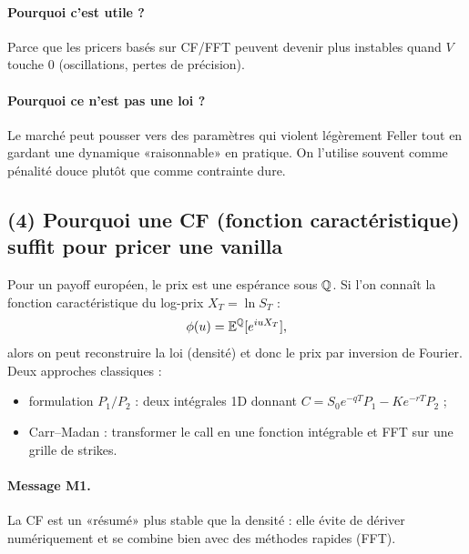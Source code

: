\paragraph{Pourquoi c'est utile ?}
Parce que les pricers basés sur CF/FFT peuvent devenir plus instables quand $V$ touche 0 (oscillations, pertes de précision).
\paragraph{Pourquoi ce n'est pas une loi ?}
Le marché peut pousser vers des paramètres qui violent légèrement Feller tout en gardant une dynamique «raisonnable» en pratique.
On l'utilise souvent comme pénalité douce plutôt que comme contrainte dure.

\subsection*{(4) Pourquoi une CF (fonction caractéristique) suffit pour pricer une vanilla}
Pour un payoff européen, le prix est une espérance sous $\mathbb{Q}$.
Si l'on connaît la fonction caractéristique du log-prix $X_T=\ln S_T$ :
\[
\phi(u)=\mathbb{E}^{\mathbb{Q}}[e^{iuX_T}],
\]
alors on peut reconstruire la loi (densité) et donc le prix par inversion de Fourier.
Deux approches classiques :
\begin{itemize}[leftmargin=*]
\item formulation $P_1/P_2$ : deux intégrales 1D donnant $C=S_0e^{-qT}P_1-Ke^{-rT}P_2$ ;
\item Carr--Madan : transformer le call en une fonction intégrable et FFT sur une grille de strikes.
\end{itemize}
\paragraph{Message M1.}
La CF est un «résumé» plus stable que la densité : elle évite de dériver numériquement et se combine bien avec des méthodes rapides (FFT).
